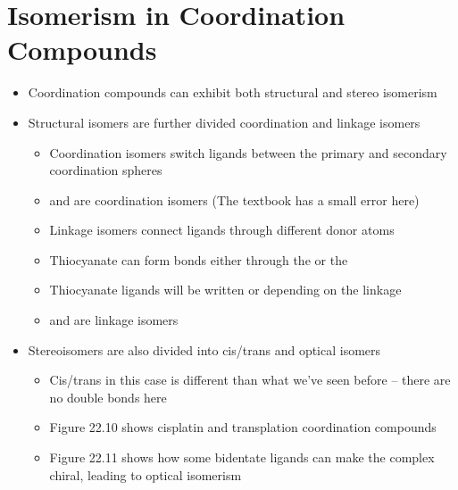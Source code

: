 \documentclass[12pt, openany, letterpaper]{memoir}
\begin{document}
\section{Isomerism in Coordination Compounds}
\begin{itemize}
	\item Coordination compounds can exhibit both structural and stereo isomerism
	\item Structural isomers are further divided coordination and linkage isomers
	\begin{itemize}
		\item Coordination isomers switch ligands between the primary and secondary coordination spheres
		\item {} and   are coordination isomers (The textbook has a small error here)
		\item Linkage isomers connect ligands through different donor atoms
		\item Thiocyanate can form bonds either through the  or the 
		\item Thiocyanate ligands will be written  or  depending on the linkage
		\item \ch{[Pd(NH3)2Cl(SCN)]} and \ch{[Pd(NH3)2Cl(NCS)]} are linkage isomers
	\end{itemize}
	\item Stereoisomers  are also divided into cis/trans and optical isomers
	\begin{itemize}
		\item Cis/trans in this case is different than what we've seen before -- there are no double bonds here
		\item Figure 22.10 shows cisplatin and transplation coordination compounds
		\item Figure 22.11 shows how some bidentate ligands can make the complex chiral, leading to optical isomerism
	\end{itemize}
\end{itemize}
\end{document}
